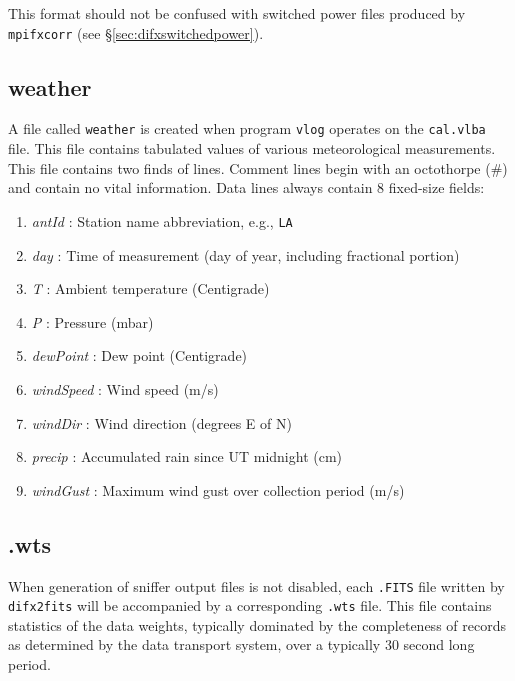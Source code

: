 This format should not be confused with switched power files produced by {\tt mpifxcorr} (see \S\ref{sec:difxswitchedpower}).







\subsection{weather} \label{sec:weather}

A file called {\tt weather} is created when program {\tt vlog} operates on the {\tt cal.vlba} file.
This file contains tabulated values of various meteorological measurements.
This file contains two finds of lines.
Comment lines begin with an octothorpe (\#) and contain no vital information.
Data lines always contain 8 fixed-size fields:
\begin{enumerate}
\item {\em antId} : Station name abbreviation, e.g., {\tt LA}
\item {\em day} : Time of measurement (day of year, including fractional portion)
\item {\em T} : Ambient temperature (Centigrade)
\item {\em P} : Pressure (mbar)
\item {\em dewPoint} : Dew point (Centigrade)
\item {\em windSpeed} : Wind speed (m/s)
\item {\em windDir} : Wind direction (degrees E of N)
\item {\em precip} : Accumulated rain since UT midnight (cm)
\item {\em windGust} : Maximum wind gust over collection period (m/s)
\end{enumerate}









\subsection{.wts} \label{sec:wts}

When generation of sniffer output files is not disabled, each {\tt .FITS} file written by {\tt difx2fits} will be accompanied by a corresponding {\tt .wts} file. 
This file contains statistics of the data weights, typically dominated by the completeness of records as determined by the data transport system, over a typically 30 second long period.

